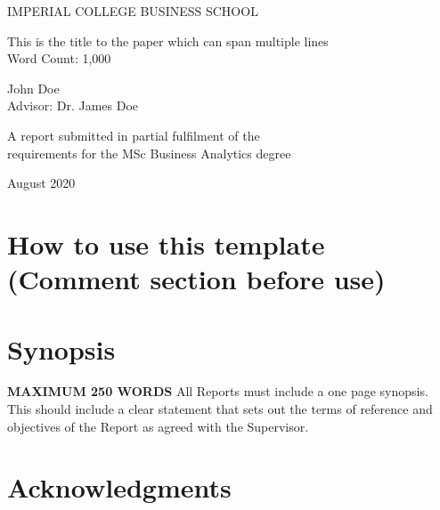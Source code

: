 \documentclass[a4paper,11, oneside]{article}
\begin{document}
	\begin{center}
		{\large IMPERIAL COLLEGE BUSINESS SCHOOL}
	\end{center}
	\vspace{6cm}
	
	\begin{center}
		
		\Huge This is the title to the paper which can span multiple lines\\		
		\vspace{.5cm}		
		\large {Word Count: 1,000}
		
	\end{center}
	\vspace{2.5cm}
	\begin{center}
		\Large John Doe\\Advisor: Dr. James Doe
	\end{center}
	
	\vspace{8cm}
	\begin{center}
		{\large A report submitted in partial fulfilment of the \\requirements for the MSc Business Analytics degree}
	\end{center}
	
	\begin{center}
		{\large August 2020}
	\end{center}		

	\newpage

\section{How to use this template (Comment section before use)}

\pagebreak

\section*{Synopsis}
\textbf{MAXIMUM 250 WORDS}
All Reports must include a one page synopsis. This should include a clear statement that sets out the terms of reference and objectives of the Report as agreed with the Supervisor.
%


\pagebreak

\section*{Acknowledgments}
%
\blindtext
\pagebreak
\end{document}
